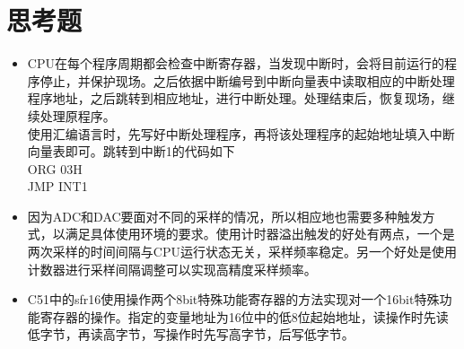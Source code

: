 \section{思考题}
\begin{itemize}
	\item CPU在每个程序周期都会检查中断寄存器，当发现中断时，会将目前运行的程序停止，并保护现场。之后依据中断编号到中断向量表中读取相应的中断处理程序地址，之后跳转到相应地址，进行中断处理。处理结束后，恢复现场，继续处理原程序。\\
	使用汇编语言时，先写好中断处理程序，再将该处理程序的起始地址填入中断向量表即可。跳转到中断1的代码如下\\
	ORG 03H\\
	JMP INT1
	\item 因为ADC和DAC要面对不同的采样的情况，所以相应地也需要多种触发方式，以满足具体使用环境的要求。使用计时器溢出触发的好处有两点，一个是两次采样的时间间隔与CPU运行状态无关，采样频率稳定。另一个好处是使用计数器进行采样间隔调整可以实现高精度采样频率。
	\item C51中的sfr16使用操作两个8bit特殊功能寄存器的方法实现对一个16bit特殊功能寄存器的操作。指定的变量地址为16位中的低8位起始地址，读操作时先读低字节，再读高字节，写操作时先写高字节，后写低字节。
\end{itemize}
